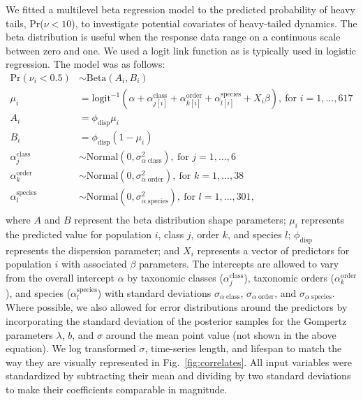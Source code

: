 We fitted a multilevel beta regression model to the predicted probability of heavy tails, Pr($\nu < 10$), to investigate potential covariates of heavy-tailed dynamics. The beta distribution is useful when the response data range on a continuous scale between zero and one. We used a logit link function as is typically used in logistic regression. The model was as follows: 
\begin{align*}
\mathrm{Pr}(\nu_i < 0.5) &\sim \mathrm{Beta}(A_i, B_i)\\
\mu_i &= \mathrm{logit}^{-1}(\alpha 
  + \alpha^\mathrm{class}_{j[i]}
  + \alpha^\mathrm{order}_{k[i]} 
  + \alpha^\mathrm{species}_{l[i]}
  + X_i \beta),
  \: \text{for } i = 1, \dots, 617\\
A_i &= \phi_\mathrm{disp} \mu_i\\
B_i &= \phi_\mathrm{disp} (1 - \mu_i)\\
\alpha^\mathrm{class}_j &\sim 
  \mathrm{Normal}(0, \sigma^2_{\alpha \; \mathrm{class}}), 
  \: \text{for } j = 1, \dots, 6\\
\alpha^\mathrm{order}_k &\sim 
  \mathrm{Normal}(0, \sigma^2_{\alpha \; \mathrm{order}}), 
  \: \text{for } k = 1, \dots, 38\\
\alpha^\mathrm{species}_l &\sim 
  \mathrm{Normal}(0, \sigma^2_{\alpha \; \mathrm{species}}),
  \: \text{for } l = 1, \dots, 301,\\
\end{align*}
where $A$ and $B$ represent the beta distribution shape parameters; $\mu_i$ represents the predicted value for population $i$, class $j$, order $k$, and species $l$; $\phi_\mathrm{disp}$ represents the dispersion parameter; and $X_i$ represents a vector of predictors for population $i$ with associated $\beta$ parameters. The intercepts are allowed to vary from the overall intercept $\alpha$ by taxonomic classes ($\alpha^\mathrm{class}_j$), taxonomic orders ($\alpha^\mathrm{order}_k$), and species ($\alpha^\mathrm{species}_l$) with standard deviations $\sigma_{\alpha \; \mathrm{class}}$, $\sigma_{\alpha \; \mathrm{order}}$, and $\sigma_{\alpha \; \mathrm{species}}$. Where possible, we also allowed for error distributions around the predictors by incorporating the standard deviation of the posterior samples for the Gompertz parameters $\lambda$, $b$, and $\sigma$ around the mean point value (not shown in the above equation). We log transformed $\sigma$, time-series length, and lifespan to match the way they are visually represented in Fig.~\ref{fig:correlates}. All input variables were standardized by subtracting their mean and dividing by two standard deviations \citep{gelman2008c} to make their coefficients comparable in magnitude.

